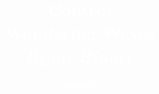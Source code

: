 

\newcommand{\confTitle}{Control} %
\newcommand{\hmwkDueDate}{Wondering Waves} %
\newcommand{\Places}{Bijan Binaee} %
\newcommand{\confCompany}{Summary} %
\newcommand{\hwPageHeader}{Control} %



\title{
\vspace{3.5in}
\textcolor{white}{\textmd{\fontsize{40}{40}\textbf{\confTitle}}\\
\vspace{3.75in}
\small{\hmwkDueDate}\\
\large{\textit{\Places}}
}
}


\author{\textcolor{white}{\textbf{\confCompany}}}
\date{} %


